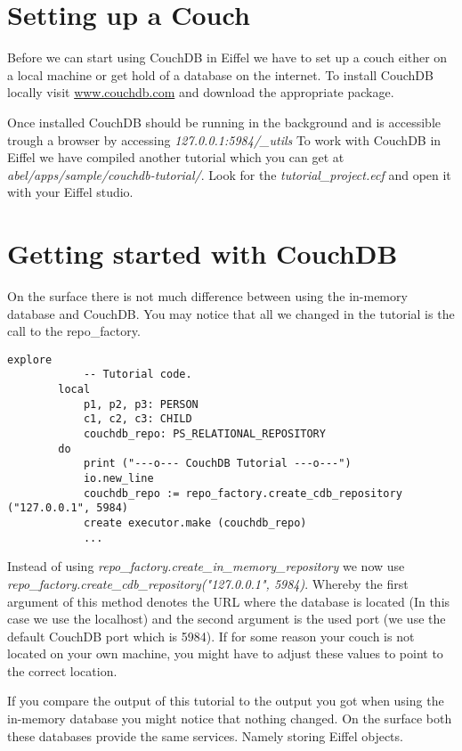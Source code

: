 \documentclass[a4paper,12pt]{report}
\begin{document}
\section{Setting up a Couch}

Before we can start using CouchDB in Eiffel we have to set up a couch either on a local machine or get hold of a database on the internet. To install CouchDB locally visit \url{www.couchdb.com} and download the appropriate package.

Once installed CouchDB should be running in the background and is accessible trough a browser by accessing \emph{127.0.0.1:5984/\_utils}
To work with CouchDB in Eiffel we have compiled another tutorial which you can get at \emph{abel/apps/sample/couchdb-tutorial/}. Look for the \emph{tutorial\_project.ecf} and open it with your Eiffel studio.

\section{Getting started with CouchDB}

On the surface there is not much difference between using the in-memory database and CouchDB. You may notice that all we changed in the tutorial is the call to the repo\_factory. 
\begin{lstlisting}[language=OOSC2Eiffel, captionpos=b, caption={The CouchDB Tutorial}, label={lst:error_visitor_example}]
	explore
			-- Tutorial code.
		local
			p1, p2, p3: PERSON
			c1, c2, c3: CHILD
			couchdb_repo: PS_RELATIONAL_REPOSITORY
		do
			print ("---o--- CouchDB Tutorial ---o---")
			io.new_line
			couchdb_repo := repo_factory.create_cdb_repository ("127.0.0.1", 5984)
			create executor.make (couchdb_repo)
			...
\end{lstlisting}
Instead of using \emph{repo\_factory.create\_in\_memory\_repository} we now use \newline
\emph{repo\_factory.create\_cdb\_repository("127.0.0.1", 5984)}.
Whereby the first argument of this method denotes the URL where the database is located (In this case we use the localhost) and the second argument is the used port (we use the default CouchDB port which is 5984). If for some reason your couch is not located on your own machine, you might have to adjust these values to point to the correct location.

If you compare the output of this tutorial to the output you got when using the in-memory database you might notice that nothing changed. On the surface both these databases provide the same services. Namely storing Eiffel objects.
\end{document}

